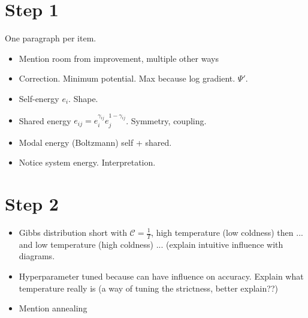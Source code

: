 \section{Step 1}
One paragraph per item.
\begin{itemize}
\item Mention room from improvement, multiple other ways
\item Correction. Minimum potential. Max because log gradient. $\Psi'$.
\item Self-energy $e_i$. Shape.
\item Shared energy $e_{ij} = e_i^{\gamma_{ij}}e_j^{1-\gamma_{ij}}$. Symmetry, coupling.
\item Modal energy (Boltzmann) self + shared.
\item Notice system energy. Interpretation.
\end{itemize}


\section{Step 2}

\begin{itemize}
\item Gibbs distribution short with $\mathcal{C} = \frac{1}{T}$, high temperature (low coldness) then ... and low temperature (high coldness) ... (explain intuitive influence with diagrams.  
\item Hyperparameter tuned because can have influence on accuracy. Explain what temperature really is (a way of tuning the strictness, better explain??)
\item Mention annealing
\end{itemize}

